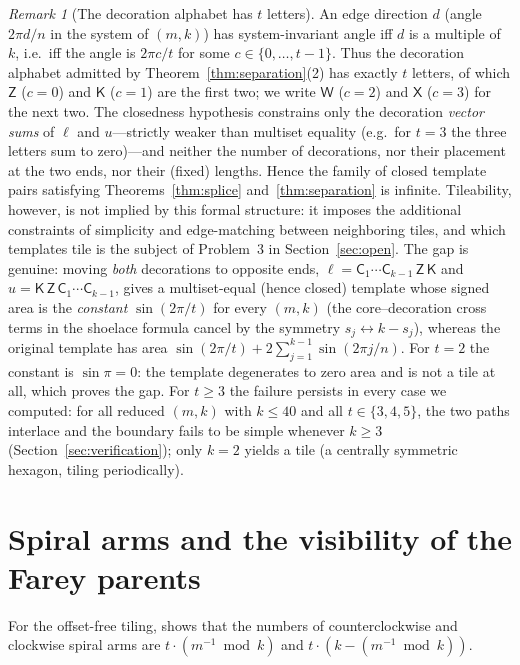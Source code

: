 \documentclass[11pt]{article}
\theoremstyle{remark}
\newtheorem{remark}[theorem]{Remark}
\theoremstyle{definition}
\newcommand{\core}{\mathsf{C}}
\newcommand{\Zt}{\mathsf{Z}}
\newcommand{\Kt}{\mathsf{K}}
\newcommand{\Wt}{\mathsf{W}}
\newcommand{\Xt}{\mathsf{X}}
\begin{document}
\begin{remark}[The decoration alphabet has $t$ letters]\label{rem:alphabet}
An edge direction $d$ (angle $2\pi d/n$ in the system of $(m,k)$) has system-invariant
angle iff $d$ is a multiple of $k$, i.e.\ iff the angle is $2\pi c/t$ for some
$c\in\{0,\dots,t-1\}$. Thus the decoration alphabet admitted by
Theorem~\ref{thm:separation}(2) has exactly $t$ letters, of which $\Zt$ ($c=0$) and
$\Kt$ ($c=1$) are the first two; we write $\Wt$ ($c=2$) and $\Xt$ ($c=3$) for the next
two. The closedness hypothesis constrains only the decoration \emph{vector sums} of
$\ell$ and $u$---strictly weaker than multiset equality (e.g.\ for $t=3$ the three
letters sum to zero)---and neither the number of decorations, nor their placement at
the two ends, nor their (fixed) lengths. Hence the family of closed template pairs
satisfying Theorems~\ref{thm:splice} and~\ref{thm:separation} is infinite. Tileability,
however, is not implied by this formal structure: it imposes the additional constraints
of simplicity and edge-matching between neighboring tiles, and which templates tile is
the subject of Problem~3 in Section~\ref{sec:open}. The gap is genuine: moving
\emph{both} decorations to opposite ends,
$\ell=\core_1\cdots\core_{k-1}\,\Zt\,\Kt$ and $u=\Kt\,\Zt\,\core_1\cdots\core_{k-1}$,
gives a multiset-equal (hence closed) template whose signed area is the \emph{constant}
$\sin(2\pi/t)$ for every $(m,k)$ (the core--decoration cross terms in the shoelace
formula cancel by the symmetry $s_j\leftrightarrow k-s_j$), whereas the original
template has area $\sin(2\pi/t)+2\sum_{j=1}^{k-1}\sin(2\pi j/n)$. For $t=2$ the
constant is $\sin\pi=0$: the template degenerates to zero area and is not a tile at
all, which proves the gap. For $t\ge3$ the failure persists in every case we
computed: for all reduced $(m,k)$ with $k\le40$ and all $t\in\{3,4,5\}$, the two
paths interlace and the boundary fails to be simple whenever $k\ge3$
(Section~\ref{sec:verification}); only $k=2$ yields a tile (a centrally symmetric
hexagon, tiling periodically).
\end{remark}

\section{Spiral arms and the visibility of the Farey parents}\label{sec:arms}

For the offset-free tiling, \cite{Imura2026} shows that the numbers of counterclockwise
and clockwise spiral arms are $t\cdot(m^{-1}\bmod k)$ and $t\cdot(k-(m^{-1}\bmod k))$.
\end{document}
